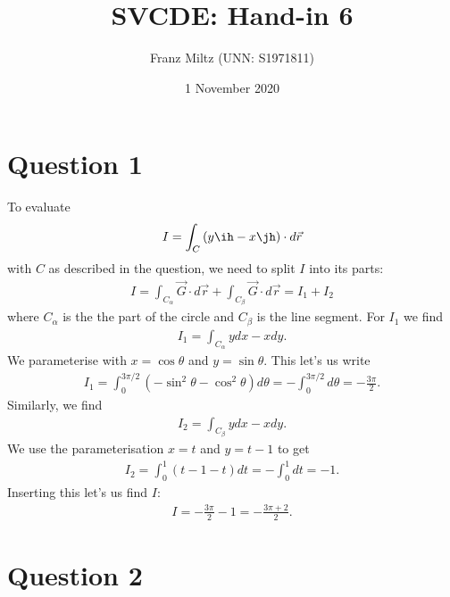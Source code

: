 \documentclass{article}
\begin{document}
\title{SVCDE: Hand-in 6}
\author{Franz Miltz (UNN: S1971811)}
\date{1 November 2020}
\maketitle


\section*{Question 1}


To evaluate
\begin{align*}
  I=\int_C \left(y\ih - x\jh\right)\cdot d\vec r 
\end{align*}
with $C$ as described in the question, we need to split $I$ into its 
parts:
\begin{align*}
  I = \int_{C_\alpha} \vec G \cdot d\vec r + \int_{C_\beta} \vec G \cdot d\vec r = I_1 + I_2
\end{align*}
where $C_\alpha$ is the the part of the circle and $C_\beta$ is the line segment.
For $I_1$ we find
\begin{align*}
  I_1 = \int_{C_\alpha} ydx-xdy.
\end{align*}
We parameterise with $x=\cos\theta$ and $y=\sin\theta$.
This let's us write
\begin{align*}
  I_1 = \int_0^{3\pi/2} \left(-\sin^2\theta - \cos^2\theta\right) d\theta
  =-\int_0^{3\pi/2}d\theta=-\frac{3\pi}{2}.
\end{align*}
Similarly, we find
\begin{align*}
  I_2 = \int_{C_\beta} ydx-xdy.
\end{align*}
We use the parameterisation $x=t$ and $y=t-1$ to get
\begin{align*}
  I_2 = \int_0^1 (t-1-t)dt=-\int_0^1 dt = -1.
\end{align*}
Inserting this let's us find $I$:
\begin{align*}
  I = -\frac{3\pi}{2}-1 = -\frac{3\pi + 2}{2}.
\end{align*}


\section*{Question 2}
\end{document}
